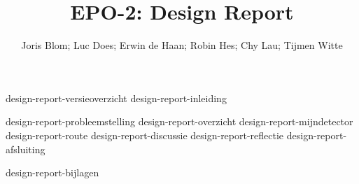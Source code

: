 \documentclass{report}
\title{EPO-2: Design Report}
\author{Joris Blom; Luc Does; Erwin de Haan; Robin Hes; Chy Lau; Tijmen Witte}
\begin{document}
\maketitle
\newpage
{}

{design-report-versieoverzicht}
{design-report-inleiding}
\tableofcontents

\newpage
{}

{design-report-probleemstelling}
{design-report-overzicht}
{design-report-mijndetector}
{design-report-route}
{design-report-discussie}
{design-report-reflectie}
{design-report-afsluiting}

\newpage
{}

\printbibliography
{design-report-bijlagen}
\end{document}
